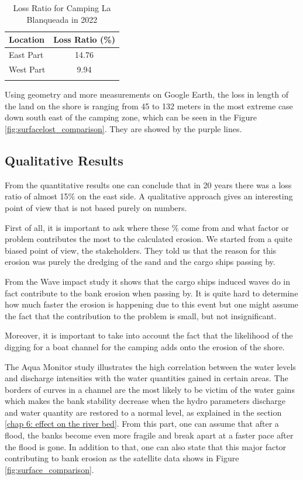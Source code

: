 \begin{table}[H]
\centering
\caption{Loss Ratio for Camping La Blanqueada in 2022}
\label{tab:LossRatio}
\begin{tabular}{l c}
\toprule
\textbf{Location} & \textbf{Loss Ratio (\%)} \\
\midrule
East Part & 14.76 \\
West Part & 9.94 \\
\bottomrule
\label{Table:Loss Ratio for Camping La Blanqueada in 2022}
\end{tabular}
\end{table}

Using geometry and more measurements on Google Earth, the loss in length of the land on the shore is ranging from 45 to 132 meters in the most extreme case down south east of the camping zone, which can be seen in the Figure \ref{fig:surfacelost_comparison}. They are showed by the purple lines.

\subsection{Qualitative Results}
From the quantitative results one can conclude that in 20 years there was a loss ratio of almost 15\% on the east side. A qualitative approach gives an interesting point of view that is not based purely on numbers.

First of all, it is important to ask where these \% come from and what factor or problem contributes the most to the calculated erosion. We started from a quite biased point of view, the stakeholders. They told us that the reason for this erosion was purely the dredging of the sand and the cargo ships passing by. 

From the Wave impact study it shows that the cargo ships induced waves do in fact contribute to the bank erosion when passing by. It is quite hard to determine how much faster the erosion is happening due to this event but one might assume the fact that the contribution to the problem is small, but not insignificant. 

Moreover, it is important to take into account the fact that the likelihood of the digging for a boat channel for the camping adds onto the erosion of the shore.

The Aqua Monitor study illustrates the high correlation between the water levels and discharge intensities with the water quantities gained in certain areas. The borders of curves in a channel are the most likely to be victim of the water gains which makes the bank stability decrease when the hydro parameters discharge and water quantity are restored to a normal level, as explained in the section \ref{chap 6: effect on the river bed}. From this part, one can assume that after a flood, the banks become even more fragile and break apart at a faster pace after the flood is gone.
In addition to that, one can also state that this major factor contributing to bank erosion as the satellite data shows in Figure \ref{fig:surface_comparison}.

